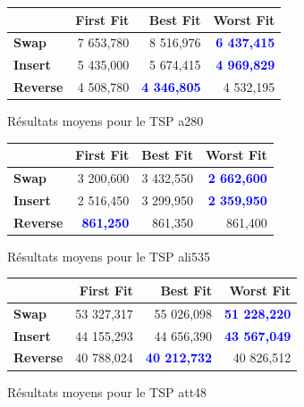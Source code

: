 \documentclass[a4paper,10pt]{report}
\begin{document}

\begin{figure}[ht]
  \begin{center}
    \begin{tabular}{|l|r|r|r|}
      \hline
      &		\textbf{First Fit}&	\textbf{Best Fit}&	\textbf{Worst
Fit}\\\hline
      \textbf{Swap}&	
	  7 653,780&
	  8 516,976&
	  \textbf{\textcolor{blue}{6 437,415}}\\\hline
      \textbf{Insert}&
	  5 435,000&
	  5 674,415&
	  \textbf{\textcolor{blue}{4 969,829}}\\\hline
      \textbf{Reverse}&
	  4 508,780&
	  \textbf{\textcolor{blue}{4 346,805}}&
	  4 532,195\\\hline
    \end{tabular}
    \label{a280-results}
    \caption{Résultats moyens pour le TSP a280}
  \end{center}
\end{figure}

\begin{figure}[ht]
  \begin{center}
    \begin{tabular}{|l|r|r|r|}
      \hline
      &		\textbf{First Fit}&	\textbf{Best Fit}&	\textbf{Worst
Fit}\\\hline
      \textbf{Swap}&
	  3 200,600&
	  3 432,550&
	  \textbf{\textcolor{blue}{2 662,600}}\\\hline
      \textbf{Insert}&
	  2 516,450&
	  3 299,950&
	  \textbf{\textcolor{blue}{2 359,950}}\\\hline
      \textbf{Reverse}&
	  \textbf{\textcolor{blue}{861,250}}&
	  861,350&
	  861,400\\\hline
    \end{tabular}
    \label{ali535-results}
    \caption{Résultats moyens pour le TSP ali535}
  \end{center}
\end{figure}

\begin{figure}[ht]
  \begin{center}
    \begin{tabular}{|l|r|r|r|}
      \hline
      &		\textbf{First Fit}&	\textbf{Best Fit}&	\textbf{Worst
Fit}\\\hline
      \textbf{Swap}&
	  53 327,317&
	  55 026,098&
	  \textbf{\textcolor{blue}{51 228,220}}\\\hline
      \textbf{Insert}&
	  44 155,293&
	  44 656,390&
	  \textbf{\textcolor{blue}{43 567,049}}\\\hline
      \textbf{Reverse}&
	  40 788,024&
	  \textbf{\textcolor{blue}{40 212,732}}&
	  40 826,512\\\hline
    \end{tabular}
    \label{att48-results}
    \caption{Résultats moyens pour le TSP att48}
  \end{center}
\end{figure}
\end{document}
